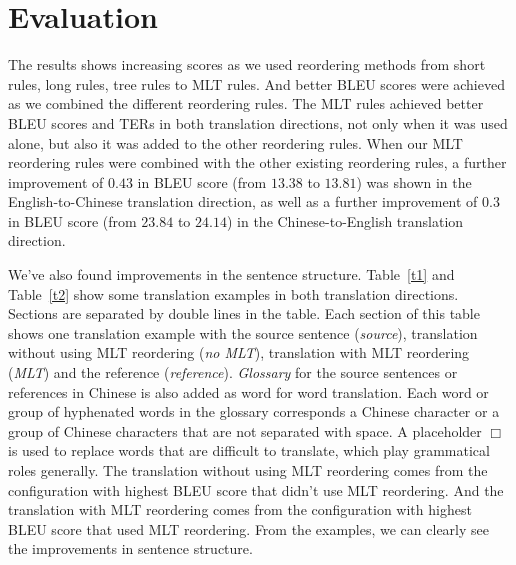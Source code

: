 \section{Evaluation}
\label{ch:Evaluation:sec:Evaluation}

The results shows increasing scores as we used reordering methods from short rules, long rules, tree rules to \ac{MLT} rules. And better \ac{BLEU} scores were achieved as we combined the different reordering rules. The \ac{MLT} rules achieved better \ac{BLEU} scores and \ac{TER}s in both translation directions, not only when it was used alone, but also it was added to the other reordering rules. When our \ac{MLT} reordering rules were combined with the other existing reordering rules, a further improvement of $0.43$ in \ac{BLEU} score (from $13.38$ to $13.81$) was shown in the English-to-Chinese translation direction, as well as a further improvement of $0.3$ in \ac{BLEU} score (from $23.84$ to $24.14$) in the Chinese-to-English translation direction.

We've also found improvements in the sentence structure. Table~\ref{t1} and Table~\ref{t2} show some translation examples in both translation directions. Sections are separated by double lines in the table. Each section of this table shows one translation example with the source sentence (\emph{source}), translation without using MLT reordering (\emph{no MLT}), translation with MLT reordering (\emph{MLT}) and the reference (\emph{reference}). \emph{Glossary} for the source sentences or references in Chinese is also added as word for word translation. Each word or group of hyphenated words in the glossary corresponds a Chinese character or a group of Chinese characters that are not separated with space. A placeholder $\Box$ is used to replace words that are difficult to translate, which play grammatical roles generally. The translation without using \ac{MLT} reordering comes from the configuration with highest \ac{BLEU} score that didn't use \ac{MLT} reordering. And the translation with \ac{MLT} reordering comes from the configuration with highest \ac{BLEU} score that used \ac{MLT} reordering. From the examples, we can clearly see the improvements in sentence structure.

